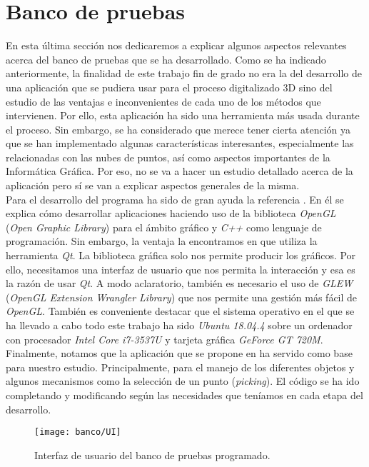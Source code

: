 \chapter{Banco de pruebas}

En esta última sección nos dedicaremos a explicar algunos aspectos relevantes acerca del banco de pruebas que se ha desarrollado. Como se ha indicado anteriormente, la finalidad de este trabajo fin de grado no era la del desarrollo de una aplicación que se pudiera usar para el proceso digitalizado 3D sino del estudio de las ventajas e inconvenientes de cada uno de los métodos que intervienen. Por ello, esta aplicación ha sido una herramienta más usada durante el proceso. Sin embargo, se ha considerado que merece tener cierta atención ya que se han implementado algunas características interesantes, especialmente las relacionadas con las nubes de puntos, así como aspectos importantes de la Informática Gráfica. Por eso, no se va a hacer un estudio detallado acerca de la aplicación pero sí se van a explicar aspectos generales de la misma. \\

Para el desarrollo del programa ha sido de gran ayuda la referencia \cite{QT+Opengl}. En él se explica cómo desarrollar aplicaciones haciendo uso de la biblioteca \textit{OpenGL} (\textit{Open Graphic Library}) para el ámbito gráfico y \textit{C++} como lenguaje de programación. Sin embargo, la ventaja la encontramos en que utiliza la herramienta \textit{Qt}. La biblioteca gráfica solo nos permite producir los gráficos. Por ello, necesitamos una interfaz de usuario que nos permita la interacción y esa es la razón de usar \textit{Qt}. A modo aclaratorio, también es necesario el uso de \textit{GLEW} (\textit{OpenGL Extension Wrangler Library}) que nos permite una gestión más fácil de \textit{OpenGL}. También es conveniente destacar que el sistema operativo en el que se ha llevado a cabo todo este trabajo ha sido \textit{Ubuntu 18.04.4} sobre un ordenador con procesador \textit{Intel Core i7-3537U} y tarjeta gráfica \textit{GeForce GT 720M}.\\

Finalmente, notamos que la aplicación que se propone en \cite{QT+Opengl} ha servido como base para nuestro estudio. Principalmente, para el manejo de los diferentes objetos y algunos mecanismos como la selección de un punto (\textit{picking}). El código se ha ido completando y modificando según las necesidades que teníamos en cada etapa del desarrollo.

\begin{figure}
	\centering
	\texttt{[image: banco/UI]}
	\caption{Interfaz de usuario del banco de pruebas programado.}
	\label{fig:ui}
\end{figure}


